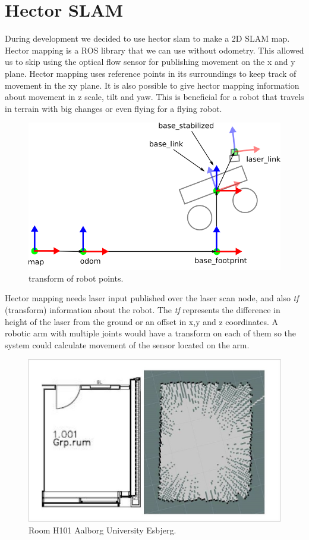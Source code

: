 \clearpage
\section{Hector SLAM}
During development we decided to use hector slam to make a 2D SLAM map. Hector mapping is a ROS library that we can use without odometry.\cite{hectormapping}
This allowed us to skip using the optical flow sensor for publishing movement on the x and y plane. Hector mapping uses reference points in its surroundings to keep track of movement in the xy plane. It is also possible to give hector mapping information about movement in z scale, tilt and yaw. This is beneficial for a robot that travels in terrain with big changes or even flying for a flying robot. 

\begin{figure}[H]
	\centering
	\includegraphics[width=.5\linewidth]{images/tf.png}
	\caption{transform of robot points.\cite{tfrobot}}
\end{figure}

Hector mapping needs laser input published over the laser scan node, and also \textit{tf} (transform) information about the robot. The \textit{tf} represents the difference in height of the laser from the ground or an offset in x,y and z coordinates. A robotic arm with multiple joints would have a transform on each of them so the system could calculate movement of the sensor located on the arm.

\begin{figure}[H]
	\centering
	\includegraphics[width=.5\linewidth]{images/compare.jpg}
	\caption{Room H101 Aalborg University Esbjerg.}
\end{figure}

